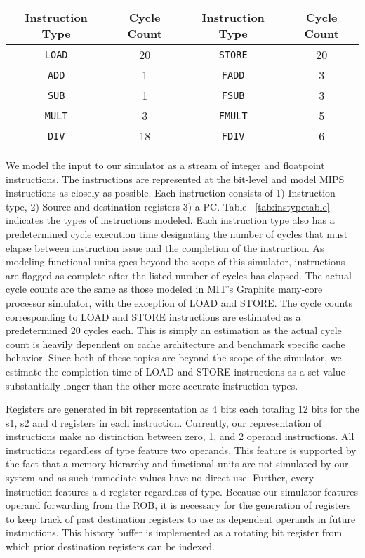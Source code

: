 \documentclass{acm_proc_article-sp}
\begin{document}
\begin{table*}
\centering
\begin{tabular}{|c|c|c|c|} \hline
Instruction Type&Cycle Count&Instruction Type&Cycle Count\\ \hline
\texttt{LOAD}&20&\texttt{STORE}&20\\ \hline
\texttt{ADD}&1&\texttt{FADD}&3\\ \hline
\texttt{SUB}&1&\texttt{FSUB}&3\\ \hline
\texttt{MULT}&3&\texttt{FMULT}&5\\ \hline
\texttt{DIV}&18&\texttt{FDIV}&6\\ \hline\end{tabular}
\caption{Modeled instruction types and their corresponding completion cycle counts.}
\label{tab:instypetable}
\end{table*}

We model the input to our simulator as a stream of integer and floatpoint instructions.  The instructions are represented at the bit-level and model MIPS instructions as closely as possible.  Each instruction consists of 1) Instruction type, 2) Source and destination registers 3) a PC.  Table ~\ref{tab:instypetable} indicates the types of instructions modeled.  Each instruction type also has a predetermined cycle execution time designating the number of cycles that must elapse between instruction issue and the completion of the instruction.  As modeling functional units goes beyond the scope of this simulator, instructions are flagged as complete after the listed number of cycles has elapsed.  The actual cycle counts are the same as those modeled in MIT's Graphite many-core processor simulator\cite{graphite}, with the exception of LOAD and STORE.  The cycle counts corresponding to LOAD and STORE instructions are estimated as a predetermined 20 cycles each.  This is simply an estimation as the actual cycle count is heavily dependent on cache architecture and benchmark specific cache behavior.  Since both of these topics are beyond the scope of the simulator, we estimate the completion time of LOAD and STORE instructions as a set value substantially longer than the other more accurate instruction types.

Registers are generated in bit representation as 4 bits each totaling 12 bits for the s1, s2 and d registers in each instruction. Currently, our representation of instructions make no distinction between zero, 1, and 2 operand instructions.  All instructions regardless of type feature two operands.  This feature is supported by the fact that a memory hierarchy and functional units are not simulated by our system and as such immediate values have no direct use.  Further, every instruction features a d register regardless of type.  Because our simulator features operand forwarding from the ROB, it is necessary for the generation of registers to keep track of past destination registers to use as dependent operands in future instructions.  This history buffer is implemented as a rotating bit register from which prior destination registers can be indexed.
\end{document}
